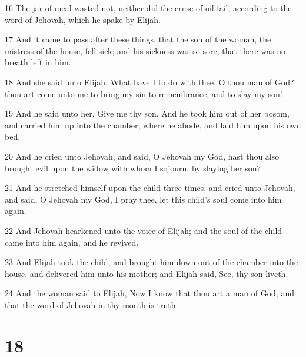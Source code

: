\par 16 The jar of meal wasted not, neither did the cruse of oil fail, according to the word of Jehovah, which he spake by Elijah.
\par 17 And it came to pass after these things, that the son of the woman, the mistress of the house, fell sick; and his sickness was so sore, that there was no breath left in him.
\par 18 And she said unto Elijah, What have I to do with thee, O thou man of God? thou art come unto me to bring my sin to remembrance, and to slay my son!
\par 19 And he said unto her, Give me thy son. And he took him out of her bosom, and carried him up into the chamber, where he abode, and laid him upon his own bed.
\par 20 And he cried unto Jehovah, and said, O Jehovah my God, hast thou also brought evil upon the widow with whom I sojourn, by slaying her son?
\par 21 And he stretched himself upon the child three times, and cried unto Jehovah, and said, O Jehovah my God, I pray thee, let this child's soul come into him again.
\par 22 And Jehovah hearkened unto the voice of Elijah; and the soul of the child came into him again, and he revived.
\par 23 And Elijah took the child, and brought him down out of the chamber into the house, and delivered him unto his mother; and Elijah said, See, thy son liveth.
\par 24 And the woman said to Elijah, Now I know that thou art a man of God, and that the word of Jehovah in thy mouth is truth.

\chapter{18}

